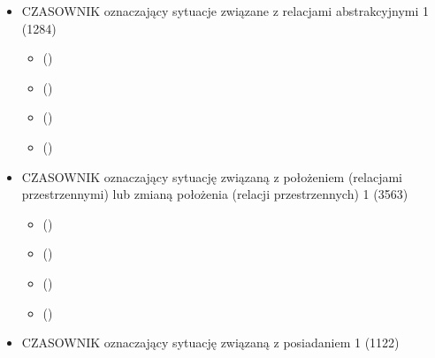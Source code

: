 \documentclass[a4paper,12pt]{article}
\begin{document}
\begin{itemize}
\begin{itemize}
\begin{itemize}
%   
%   
%   
      \begin{itemize}
      \item   ()
      \item   ()
      \item   ()
      \item   ()
      \end{itemize}
    \item CZASOWNIK oznaczający sytuacje związane z relacjami abstrakcyjnymi 1  (1284)
      \begin{itemize}
      \item   ()
      \item   ()
      \item   ()
      \item   ()
      \end{itemize}
    \item CZASOWNIK oznaczający sytuację związaną z położeniem (relacjami przestrzennymi) lub zmianą położenia (relacji przestrzennych) 1  (3563)
      \begin{itemize}
      \item   ()
      \item   ()
      \item   ()
      \item   ()
      \end{itemize}
    \item CZASOWNIK oznaczający sytuację związaną z posiadaniem 1  (1122)

\end{itemize}
\end{itemize}
\end{itemize}
\end{document}
